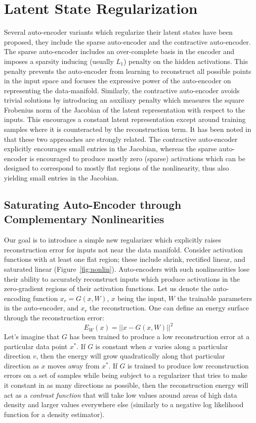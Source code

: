 \section{Latent State Regularization}  Several auto-encoder variants which
regularize their latent states have been proposed, they include the sparse
auto-encoder and the contractive auto-encoder\cite{SAE1}\cite{SAE2}\cite{CAE}.
The sparse auto-encoder includes an over-complete basis in the encoder and
imposes a sparsity inducing (usually $L_1$) penalty on the hidden activations.
This penalty prevents the auto-encoder from learning to reconstruct all
possible points in the input space and focuses the expressive power of the
auto-encoder on representing the data-manifold. Similarly, the contractive
auto-encoder avoids trivial solutions by introducing an auxiliary penalty which
measures the square  Frobenius norm of the Jacobian of the latent
representation with respect to the inputs. This encourages a constant latent
representation except around training samples where it is counteracted by the
reconstruction term. It has been noted in \cite{CAE} that these two approaches
are strongly related. The contractive auto-encoder explicitly encourages small
entries in the Jacobian, whereas the sparse auto-encoder is encouraged to
produce mostly zero (sparse) activations which can be designed to correspond to
mostly flat regions of the nonlinearity, thus also yielding small entries in
the Jacobian.

\subsection{Saturating Auto-Encoder through Complementary Nonlinearities}
Our goal is to introduce a simple new regularizer which explicitly raises
reconstruction error for inputs not near the data manifold. Consider activation
functions with at least one flat region; these include shrink, rectified
linear, and saturated linear (Figure~\ref{fig:nonlin}). Auto-encoders with such
nonlinearities lose their ability to accurately reconstruct inputs which
produce activations in the zero-gradient regions of their activation functions.
Let us denote the auto-encoding function $x_r = G(x,W)$, $x$ being the input,
$W$ the trainable parameters in the auto-encoder, and $x_r$ the reconstruction.
One can define an energy surface through the reconstruction error: \[ E_W(x) =
||x-G(x,W)||^2 \] Let's imagine that $G$ has been trained to produce a low
reconstruction error at a particular data point $x^*$. If $G$ is constant when
$x$ varies along a particular direction $v$, then the energy will grow
quadratically along that particular direction as $x$ moves away from $x^*$. If
$G$ is trained to produce low reconstruction errors on a set of samples while
being subject to a regularizer that tries to make it constant in as many
directions as possible, then the reconstruction energy will act as a {\em
contrast function} that will take low values around areas of high data density
and larger values everywhere else (similarly to a negative log likelihood
function for a density estimator).

